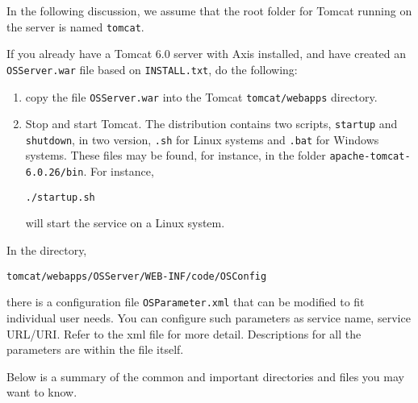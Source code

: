 \vskip 8pt
In the following discussion, we assume that the root folder for Tomcat running
on the server is named {\tt tomcat}. \vskip 8pt

If you already have a Tomcat 6.0 server with Axis installed, and have created an
{\tt OSServer.war} file based on {\tt INSTALL.txt}, do the following:
\begin{enumerate}
\item{} copy the file {\tt OSServer.war} into the Tomcat {\tt tomcat/webapps}
directory.

\item{}  Stop and start Tomcat. The distribution contains two scripts, {\tt startup} and {\tt shutdown}, in two version, {\tt .sh} for Linux systems and {\tt .bat} for Windows systems. These files may be found, for instance, in the folder {\tt apache-tomcat-6.0.26/bin}. For instance,
%
\begin{verbatim}
./startup.sh
\end{verbatim}
will start the service on a Linux system.


\end{enumerate}

In the directory,
\begin{verbatim}
tomcat/webapps/OSServer/WEB-INF/code/OSConfig
\end{verbatim}
there is a configuration file {\tt OSParameter.xml} that can be modified to fit individual user needs. 
You can configure such parameters as service name, service URL/URI. 
Refer to the xml file for more detail. Descriptions for all the parameters are within the file itself.

\vskip 8pt

Below is a summary of the common and important directories
 and files you may want to know.

